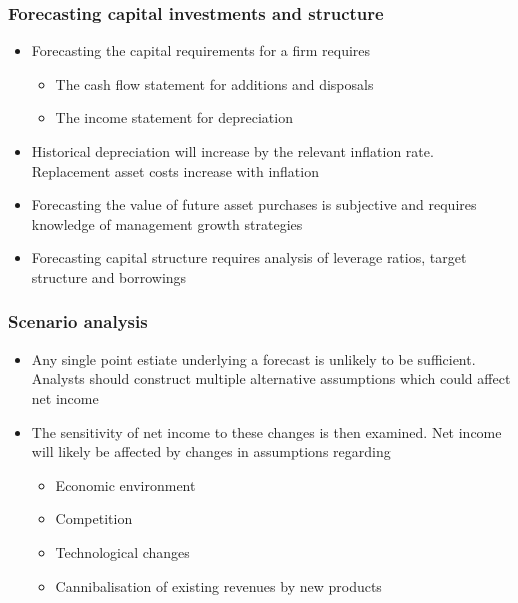 \documentclass[../notes_compiled.tex]{subfiles}
\begin{document}
\subsubsection{Forecasting capital investments and structure}
\begin{itemize}
\item Forecasting the capital requirements for a firm requires
\begin{itemize}
\item The cash flow statement for additions and disposals
\item The income statement for depreciation
\end{itemize}
\item Historical depreciation will increase by the relevant inflation rate. Replacement asset costs increase with inflation
\item Forecasting the value of future asset purchases is subjective and requires knowledge of management growth strategies
\item Forecasting capital structure requires analysis of leverage ratios, target structure and borrowings

\end{itemize}

\subsubsection{Scenario analysis}
\begin{itemize}
\item Any single point estiate underlying a forecast is unlikely to be sufficient. Analysts should construct multiple alternative assumptions which could affect net income
\item The sensitivity of net income to these changes is then examined. Net income will likely be affected by changes in assumptions regarding
\begin{itemize}
\item Economic environment
\item Competition
\item Technological changes
\item Cannibalisation of existing revenues by new products
\end{itemize}
\end{itemize}
\end{document}
